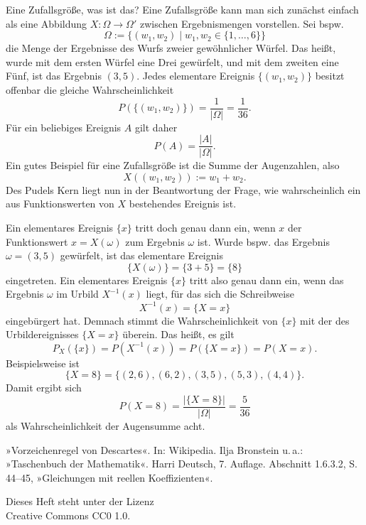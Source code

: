 \documentclass[a4paper,10pt,fleqn,twocolumn,twoside,dvipdfmx]{scrartcl}
\theoremstyle{rmbox}
\begin{document}
\noindent
Eine Zufallsgröße, was ist das? Eine Zufallsgröße kann man sich
zunächst einfach als eine Abbildung $X\colon\Omega\to\Omega'$ zwischen
Ergebnismengen vorstellen. Sei bspw.
\[\Omega := \{(w_1,w_2)\mid w_1,w_2\in\{1,\ldots,6\}\}\]
die Menge der Ergebnisse des Wurfs zweier gewöhnlicher
Würfel. Das heißt, wurde mit dem ersten Würfel eine Drei
gewürfelt, und mit dem zweiten eine Fünf, ist das Ergebnis $(3, 5)$.
Jedes elementare Ereignis $\{(w_1,w_2)\}$ besitzt offenbar
die gleiche Wahrscheinlichkeit%
\[P(\{(w_1,w_2)\}) = \frac{1}{|\Omega|} = \frac{1}{36}.\]
Für ein beliebiges Ereignis $A$ gilt daher%
\[P(A) = \frac{|A|}{|\Omega|}.\]
Ein gutes Beispiel für eine Zufallsgröße ist die Summe der
Augenzahlen, also%
\[X((w_1,w_2)) := w_1 + w_2.\]
Des Pudels Kern liegt nun in der Beantwortung der Frage, wie
wahrscheinlich ein aus Funktionswerten von $X$ bestehendes
Ereignis ist.

Ein elementares Ereignis $\{x\}$ tritt doch genau dann ein,
wenn $x$ der Funktionswert $x=X(\omega)$ zum Ergebnis
$\omega$ ist. Wurde bspw. das Ergebnis $\omega=(3, 5)$
gewürfelt, ist das elementare Ereignis%
\[\{X(\omega)\} = \{3 + 5\} = \{8\}\]
eingetreten.
Ein elementares Ereignis $\{x\}$ tritt also genau dann ein, wenn das
Ergebnis $\omega$ im Urbild $X^{-1}(x)$ liegt, für das sich die
Schreibweise%
\[X^{-1}(x)=\{X=x\}\]
eingebürgert hat. Demnach stimmt die Wahrscheinlichkeit von $\{x\}$
mit der des Urbildereignisses $\{X=x\}$ überein. Das heißt, es gilt%
\[P_X(\{x\}) = P(X^{-1}(x)) = P(\{X=x\}) = P(X=x).\]
Beispielsweise ist
\[\{X=8\} = \{(2,6), (6,2), (3,5), (5,3), (4,4)\}.\]
Damit ergibt sich
\[P(X=8) = \frac{|\{X=8\}|}{|\Omega|} = \frac{5}{36}\]
als Wahrscheinlichkeit der Augensumme acht.

\begin{thebibliography}{00}
 »Vorzeichenregel von Descartes«. In: Wikipedia.
 Ilja Bronstein u.\,a.: »Taschenbuch der Mathematik«.
Harri Deutsch, 7. Auflage. Abschnitt 1.6.3.2, S. 44--45, »Gleichungen mit
reellen Koeffizienten«.
\end{thebibliography}


\vfill\noindent
Dieses Heft steht unter der Lizenz\\
Creative Commons CC0 1.0.
\end{document}
